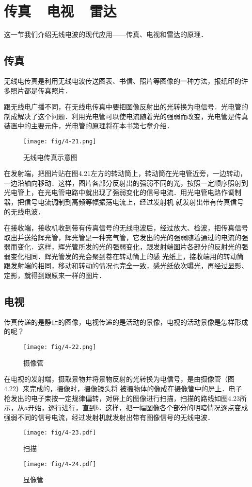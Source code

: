 \section{传真~~电视~~雷达}
这一节我们介绍无线电波的现代应用——传真、电视和雷达的原理．

\subsection{传真}

无线电传真是利用无线电波传送图表、书信、照片等图像的一种方法，报纸印的许多照片都是传真照片．

跟无线电广播不同，在无线电传真中要把图像反射出的光转换为电信号．光电管的制成解决了这个问题．利用光电管可以使电流随着光的强弱而改变，光电管是传真装置中的主要元件，光电管的原理将在本书第七章介绍．
\begin{figure}[htp]\centering
	\texttt{[image: fig/4-21.png]}
	\caption{无线电传真示意图}
	\end{figure}

在发射端，把图片贴在图4.21左方的转动筒上，转动筒在光电管近旁，一边转动，一边沿轴向移动．这样，图片各部分反射出的强弱不同的光，按照一定顺序照射到光电管上，在光电管电路中就出现了强弱变化的信号电流．用光电管电路作调制器，把信号电流调制到高频等幅振荡电流上，经过发射机
就发射出带有传真信号的无线电波．

在接收端，接收机收到带有传真信号的无线电波后，经过放大、检波，把传真信号取出并送给辉光管，辉光管是一种充气管，它发出的光的强弱随着通过的电流的强弱而变化．这样，辉光管所发的光的强弱变化，跟发射端图片各部分的反射光的强弱变化相同．辉光管发的光会聚到卷在转动筒上的感
光纸上，接收端用的转动筒跟发射端的相同，移动和转动的情况也完全一致，感光纸依次曝光，再经过显影、定影，就得到跟原来一样的图片．

\subsection{电视}

传真传递的是静止的图像，电视传递的是活动的景像，电视的活动景像是怎样形成的呢？
\begin{figure}[htp]\centering
	\texttt{[image: fig/4-22.png]}
	\caption{摄像管}
	\end{figure}

在电视的发射端，摄取景物并将景物反射的光转换为电信号，是由摄像管（图4.22）来完成的，摄像时，摄像镜头将
被摄物体的像成在摄像管中的屏上．电子枪发出的电子束按一定规律偏转，对屏上的图像进行扫描，扫描的路线如图4.23所示，从$a$开始，逐行进行，直到$b$．这样，把一幅图像各个部分的明暗情况逐点变成强弱不同的信号电流，经过发射机就发射出带有图像信号的无线电波．
\begin{figure}[htp]
	\centering
	\begin{minipage}[t]{0.48\textwidth}
	\centering
	\texttt{[image: fig/4-23.pdf]}
	\caption{扫描}
	\end{minipage}
	\begin{minipage}[t]{0.48\textwidth}
	\centering
	\texttt{[image: fig/4-24.pdf]}
	\caption{显像管}
	\end{minipage}
	\end{figure}
	
